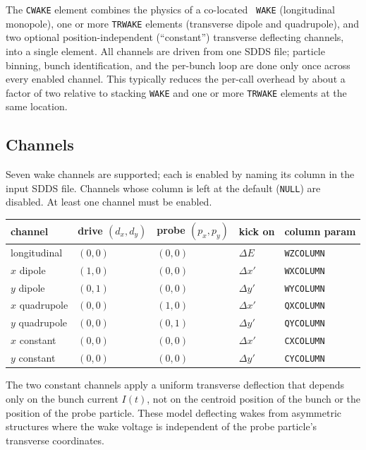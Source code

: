 The {\tt CWAKE} element combines the physics of a co-located {\tt
WAKE} (longitudinal monopole), one or more {\tt TRWAKE} elements
(transverse dipole and quadrupole), and two optional
position-independent (``constant'') transverse deflecting channels,
into a single element.  All channels are driven from one SDDS file;
particle binning, bunch identification, and the per-bunch loop are
done only once across every enabled channel.  This typically reduces
the per-call overhead by about a factor of two relative to stacking
{\tt WAKE} and one or more {\tt TRWAKE} elements at the same location.

\subsection*{Channels}

Seven wake channels are supported; each is enabled by naming its
column in the input SDDS file.  Channels whose column is left at the
default ({\tt NULL}) are disabled.  At least one channel must be
enabled.

\begin{center}
\begin{tabular}{lllll}
\hline
channel        & drive $(d_x,d_y)$ & probe $(p_x,p_y)$ & kick on     & column param \\\hline
longitudinal   & $(0,0)$           & $(0,0)$           & $\Delta E$  & {\tt WZCOLUMN} \\
$x$ dipole     & $(1,0)$           & $(0,0)$           & $\Delta x'$ & {\tt WXCOLUMN} \\
$y$ dipole     & $(0,1)$           & $(0,0)$           & $\Delta y'$ & {\tt WYCOLUMN} \\
$x$ quadrupole & $(0,0)$           & $(1,0)$           & $\Delta x'$ & {\tt QXCOLUMN} \\
$y$ quadrupole & $(0,0)$           & $(0,1)$           & $\Delta y'$ & {\tt QYCOLUMN} \\
$x$ constant   & $(0,0)$           & $(0,0)$           & $\Delta x'$ & {\tt CXCOLUMN} \\
$y$ constant   & $(0,0)$           & $(0,0)$           & $\Delta y'$ & {\tt CYCOLUMN} \\
\hline
\end{tabular}
\end{center}

The two constant channels apply a uniform transverse deflection that depends only on the bunch current $I(t)$, not on
the centroid position of the bunch or the position of the probe particle.  These model deflecting wakes from asymmetric
structures where the wake voltage is independent of the probe particle's transverse coordinates.

